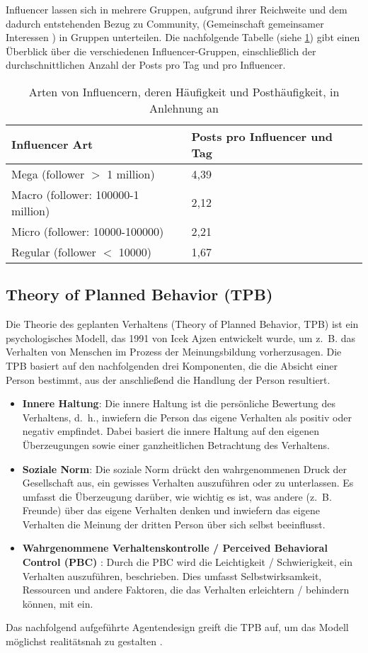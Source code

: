 \documentclass[runningheads]{llncs}
\begin{document}
Influencer lassen sich in mehrere Gruppen, aufgrund ihrer Reichweite und dem dadurch entstehenden Bezug zu Community, (Gemeinschaft gemeinsamer Interessen \cite{esch_definition_nodate}) in Gruppen unterteilen.
Die nachfolgende Tabelle (siehe \ref{tab:influencer_types}) gibt einen Überblick über die verschiedenen Influencer-Gruppen, einschließlich der durchschnittlichen Anzahl der Posts pro Tag und pro Influencer.
\begin{table}[H]
\centering
\begin{tabular}{|l|l|}
\hline
\textbf{Influencer Art}& \textbf{Posts pro Influencer und Tag}\\ \hline
Mega (follower $>$ 1 million) & 4,39\\ \hline
Macro (follower: 100000-1 million) & 2,12\\ \hline
Micro (follower: 10000-100000) & 2,21\\ \hline
Regular (follower $<$ 10000) & 1,67\\ \hline
\end{tabular}
\caption{Arten von Influencern, deren Häufigkeit und Posthäufigkeit, in Anlehnung an \cite{jiang_building_2021}}
\label{tab:influencer_types}
\end{table}

\subsection{Theory of Planned Behavior (TPB) }\label{Theory of Planned Behavior}
Die Theorie des geplanten Verhaltens (Theory of Planned Behavior, TPB) ist ein psychologisches Modell, das 1991 von Icek Ajzen entwickelt wurde, um z. B. das Verhalten von Menschen im Prozess der Meinungsbildung vorherzusagen.
Die TPB basiert auf den nachfolgenden drei Komponenten, die die Absicht einer Person bestimmt, aus der anschließend die Handlung der Person resultiert. 
\begin{itemize}
  \item \textbf{Innere Haltung}: Die innere Haltung ist die persönliche Bewertung des Verhaltens, d. h., inwiefern die Person das eigene Verhalten als positiv oder negativ empfindet. Dabei basiert die innere Haltung auf den eigenen Überzeugungen sowie einer ganzheitlichen Betrachtung des Verhaltens.
  \item \textbf{Soziale Norm}: Die soziale Norm drückt den wahrgenommenen Druck der Gesellschaft aus, ein gewisses Verhalten auszuführen oder zu unterlassen. Es umfasst die Überzeugung darüber, wie wichtig es ist, was andere (z. B. Freunde) über das eigene Verhalten denken und inwiefern das eigene Verhalten die Meinung der dritten Person über sich selbst beeinflusst. 
  \item \textbf{Wahrgenommene Verhaltenskontrolle / Perceived Behavioral Control (PBC) }: Durch die PBC wird die Leichtigkeit / Schwierigkeit, ein Verhalten auszuführen, beschrieben. Dies umfasst Selbstwirksamkeit, Ressourcen und andere Faktoren, die das Verhalten erleichtern / behindern können, mit ein. 
\end{itemize}
Das nachfolgend aufgeführte Agentendesign greift die TPB auf, um das Modell möglichst realitätsnah zu gestalten \cite{ajzen_theory_1991}. 
\end{document}
